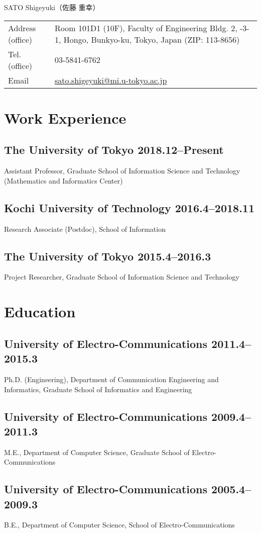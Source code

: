 \documentclass[a4paper,dvipdfmx]{article}
\newcommand{\datedsubsection}[2]{%
  \subsection[#1]{#1 \hfill #2}%
}
\begin{document}
\noindent
{\Huge SATO Shigeyuki{\LARGE（佐藤 重幸）}}
\begin{flushleft}
\begin{tabular}[t]{lp{10cm}}
Address (office) & Room 101D1 (10F), Faculty of Engineering Bldg. 2, \newline 7-3-1, Hongo, Bunkyo-ku, Tokyo, Japan (ZIP: 113-8656) \\
Tel. (office) & 03-5841-6762 \\
Email & \url{sato.shigeyuki@mi.u-tokyo.ac.jp}
\end{tabular}
\end{flushleft}

\section{Work Experience}
\datedsubsection{The University of Tokyo}{2018.12--Present}
%
Assistant Professor, Graduate School of Information Science and
Technology (Mathematics and Informatics Center)

\datedsubsection{Kochi University of Technology}{2016.4--2018.11}
%
Research Associate (Postdoc), School of Information

\datedsubsection{The University of Tokyo}{2015.4--2016.3}
%
Project Researcher, Graduate School of Information Science and
Technology

\section{Education}
\datedsubsection{University of Electro-Communications}{2011.4--2015.3}
Ph.D. (Engineering), Department of Communication Engineering and
Informatics, Graduate School of Informatics and Engineering

\datedsubsection{University of Electro-Communications}{2009.4--2011.3}
M.E., Department of Computer Science, Graduate School of Electro-Communications

\datedsubsection{University of Electro-Communications}{2005.4--2009.3}
B.E., Department of Computer Science, School of Electro-Communications
\end{document}

